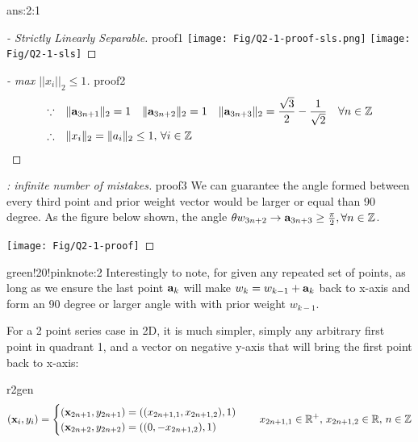 \documentclass{tron}
\begin{document}
\begin{answer}{ans:2:1}
\begin{proof}[ - Strictly Linearly Separable]{proof1}
		\texttt{[image: Fig/Q2-1-proof-sls.png]}
		\texttt{[image: Fig/Q2-1-sls]}
	\end{proof}
	\begin{proof}[ - max $||x_i||_2 \leq 1$]{proof2}
		\begin{align}
			\because \quad & \|\mathbf{a}_{3n+1}\|_2 = 1 \quad \|\mathbf{a}_{3n+2}\|_2 = 1 \quad \|\mathbf{a}_{3n+3}\|_2 = \frac{\sqrt{3}}{2} - \frac{1}{\sqrt{2}} \quad  \forall n \in \mathbb{Z}\\
			\therefore \quad & \|x_i\|_2  = \|a_i\|_2 \leq 1 , \, \forall i \in \mathbb{Z}
		\end{align}
	\end{proof}
	\begin{proof}[: infinite number of mistakes]{proof3}
		We can guarantee the angle formed between every third point and prior weight vector would be larger or equal than 90 degree.
		As the figure below shown, the angle $\theta{w_{3n+2}\rightarrow\mathbf{a}_{3n+3}} \geq \frac{\pi}{2}, \forall n \in \mathbb{Z}$.
		
		\texttt{[image: Fig/Q2-1-proof]}

	\end{proof}
	
	\begin{note}{green!20!pink}{note:2}
		Interestingly to note, for given any repeated set of points, as long as we ensure the last point $\mathbf{a}_k$ will make $w_k = w_{k-1} + \mathbf{a}_k$ back to x-axis and form an 90 degree or larger angle with with prior weight $w_{k-1}$. 
		
		For a 2 point series case in 2D, it is much simpler, simply any arbitrary first point in quadrant 1, and a vector on negative y-axis that will bring the first point back to x-axis:
	\begin{remark}{r2gen}
	\begin{equation}
	    (\mathbf{x}_i, y_i) = \begin{cases}
	    	(\mathbf{x}_{2n+1},y_{2n+1}) = ((x_{2n+1, 1}, x_{2n+1, 2}), 1) \\
	    	(\mathbf{x}_{2n+2},y_{2n+2}) = ((0, - x_{2n+1, 2}), 1)
	    \end{cases}
	    \quad 
	    x_{2n+1, 1} \in \mathbb{R^+}, \, x_{2n+1, 2} \in \mathbb{R} , \, n \in \mathbb{Z}
	\end{equation}
	\end{remark}
	

\end{note}
\end{answer}
\end{document}

